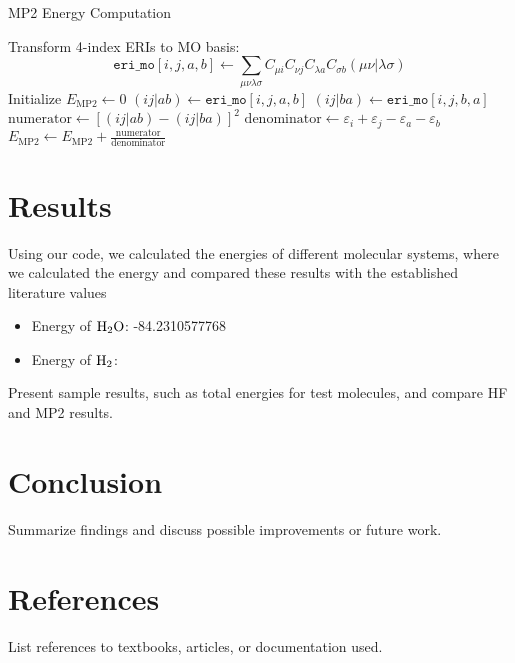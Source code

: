 \documentclass[12pt]{article}
\begin{document}
\begin{algorithm}[H]
\caption{MP2 Energy Computation}
\begin{algorithmic}[1]
\State Transform 4-index ERIs to MO basis: 
  \[
  \texttt{eri\_mo}[i,j,a,b] \gets \sum_{\mu\nu\lambda\sigma} C_{\mu i} C_{\nu j} C_{\lambda a} C_{\sigma b} (\mu\nu|\lambda\sigma)
  \]
\State Initialize \( E_{\text{MP2}} \gets 0 \)
        \State \( (ij|ab) \gets \texttt{eri\_mo}[i,j,a,b] \)
        \State \( (ij|ba) \gets \texttt{eri\_mo}[i,j,b,a] \)
        \State \( \text{numerator} \gets \left[(ij|ab) - (ij|ba)\right]^2 \)
        \State \( \text{denominator} \gets \varepsilon_i + \varepsilon_j - \varepsilon_a - \varepsilon_b \)
        \State \( E_{\text{MP2}} \gets E_{\text{MP2}} + \frac{\text{numerator}}{\text{denominator}} \)
    \EndFor
\EndFor
\end{algorithmic}
\end{algorithm}


\section{Results}
Using our code, we calculated the energies of different molecular systems, where we calculated the energy and compared these results with the established literature values
\begin{itemize}
    \item Energy of $\ce{H2O}$: -84.2310577768
    \item Energy of $\ce{H2}$:
\end{itemize}
Present sample results, such as total energies for test molecules, and compare HF and MP2 results.

\section{Conclusion}
Summarize findings and discuss possible improvements or future work.

\section*{References}
List references to textbooks, articles, or documentation used.
\end{document}
